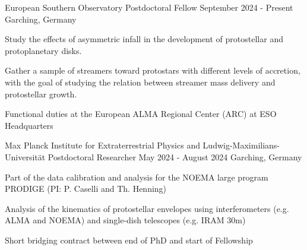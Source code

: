 \vspace{8pt}

\begin{cventries}
	
    \cventry
	{European Southern Observatory} %
	{Postdoctoral Fellow} %
	{September 2024 - Present} %
	{Garching, Germany} %
	{ \begin{cvitems} %
			\item{Study the effects of asymmetric infall in the development of protostellar and protoplanetary disks.}
            \item{Gather a sample of streamers toward protostars with different levels of accretion, with the goal of studying the relation between streamer mass delivery and protostellar growth.}
            \item{Functional duties at the European ALMA Regional Center (ARC) at ESO Headquarters}
		\end{cvitems}
	}
	\cventry
	{Max Planck Institute for Extraterrestrial Physics and Ludwig-Maximilians-Universit\"at} %
	{Postdoctoral Researcher} %
	{May 2024 - August 2024} %
	{Garching, Germany} %
	{ \begin{cvitems} %
			\item{Part of the data calibration and analysis for the NOEMA large program PRODIGE (PI: P. Caselli and Th. Henning)}
			\item{Analysis of the kinematics of protostellar envelopes using interferometers (e.g. ALMA and NOEMA) and single-dish telescopes (e.g. IRAM 30m)}
            \item{Short bridging contract between end of PhD and start of Fellowship}
		\end{cvitems}
	}
	
	
\end{cventries}
\vspace{10pt}

